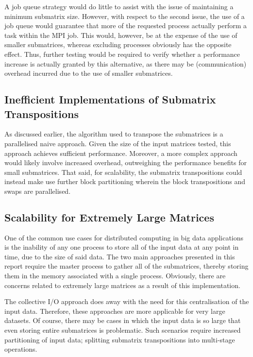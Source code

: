 \documentclass[journal,10pt,a4paper]{IEEEtran}
\begin{document}
A job queue strategy would do little to assist with the issue of maintaining a minimum submatrix size. However, with respect to the second issue, the use of a job queue would guarantee that more of the requested process actually perform a task within the MPI job. This would, however, be at the expense of the use of smaller submatrices, whereas excluding processes obviously has the opposite effect. Thus, further testing would be required to verify whether a performance increase is actually granted by this alternative, as there may be (communication) overhead incurred due to the use of smaller submatrices.


\vspace*{-0.3 cm}

\subsection{Inefficient Implementations of Submatrix Transpositions}

As discussed earlier, the algorithm used to transpose the submatrices is a parallelised naive approach. Given the size of the input matrices tested, this approach achieves sufficient performance. Moreover, a more complex approach would likely involve increased overhead, outweighing the performance benefits for small submatrices. That said, for scalability, the submatrix transpositions could instead make use further block partitioning wherein the block transpositions and swaps are parallelised.


\subsection{Scalability for Extremely Large Matrices}

One of the common use cases for distributed computing in big data applications is the inability of any one process to store all of the input data at any point in time, due to the size of said data. The two main approaches presented in this report require the master process to gather all of the submatrices, thereby storing them in the memory associated with a single process. Obviously, there are concerns related to extremely large matrices as a result of this implementation.

The collective I/O approach does away with the need for this centralisation of the input data. Therefore, these approaches are more applicable for very large datasets. Of course, there may be cases in which the input data is so large that even storing entire submatrices is problematic. Such scenarios require increased partitioning of input data; splitting submatrix transpositions into multi-stage operations.
\end{document}
